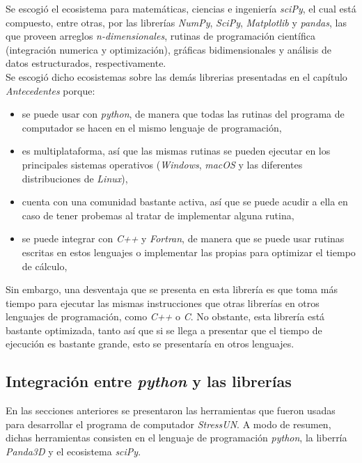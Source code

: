 Se escogió el ecosistema para matemáticas, ciencias e ingeniería \textit{sciPy}, el cual está compuesto, entre otras, por las librerías \textit{NumPy}, \textit{SciPy}, \textit{Matplotlib} y \textit{pandas}, las que proveen arreglos \textit{n-dimensionales}, rutinas de programación científica (integración numerica y optimización), gráficas bidimensionales y análisis de datos estructurados, respectivamente. \\

Se escogió dicho ecosistemas sobre las demás librerias presentadas en el capítulo \textit{Antecedentes} porque:
\begin{itemize}
    \item se puede usar con \textit{python}, de manera que todas las rutinas del programa de computador se hacen en el mismo lenguaje de programación, 
    \item es multiplataforma, así que las mismas rutinas se pueden ejecutar en los principales sistemas operativos (\textit{Windows}, \textit{macOS} y las diferentes distribuciones de \textit{Linux}), 
    \item cuenta con una comunidad bastante activa, así que se puede acudir a ella en caso de tener probemas al tratar de implementar alguna rutina, 
    \item se puede integrar con \textit{C++} y \textit{Fortran}, de manera que se puede usar rutinas escritas en estos lenguajes o implementar las propias para optimizar el tiempo de cálculo, 
\end{itemize}

Sin embargo, una desventaja que se presenta en esta librería es que toma más tiempo para ejecutar las mismas instrucciones que otras librerías en otros lenguajes de programación, como \textit{C++} o \textit{C}. No obstante, esta librería está bastante optimizada, tanto así que si se llega a presentar que el tiempo de ejecución es bastante grande, esto se presentaría en otros lenguajes.

\subsection{Integración entre \textit{python} y las librerías}

En las secciones anteriores se presentaron las herramientas que fueron usadas para desarrollar el programa de computador \textit{StressUN}. A modo de resumen, dichas herramientas consisten en el lenguaje de programación \textit{python}, la liberría \textit{Panda3D} y el ecosistema \textit{sciPy}. \\

